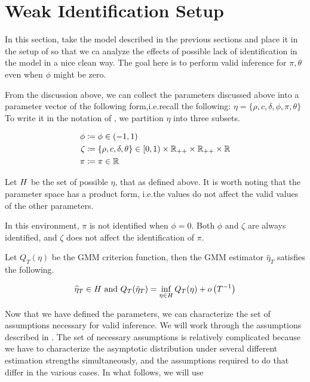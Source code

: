 \documentclass[11pt, letterpaper, twoside, final]{article}
\begin{document}
\section{Weak Identification Setup}

In this section, take the model described in the previous sections and place it in the setup of
\textcite{andrews2014Gmm} so that we ca analyze the effects of possible lack of identification in the model in a
nice clean way.
The goal here is to perform valid inference for $\pi, \theta$ even when $\phi$ might be zero. 


From the discussion above, we can collect the parameters discussed above into a parameter vector of the following
form,i.e.\@ recall the following: $\eta = \lbrace \rho, c, \delta, \phi, \pi, \theta \rbrace$
To write it in the notation of \textcite{andrews2014Gmm}, we partition $\eta$ into three subsets.

\begin{align}
    \phi &\coloneqq \phi  \in (-1, 1) \\ 
    \zeta &\coloneqq \lbrace \rho, c, \delta, \theta \rbrace \in [0,1) \times \mathbb{R}_{++} \times \mathbb{R}_{++} \times
    \mathbb{R}  \\
    \pi &\coloneqq \pi \in \mathbb{R} 
\end{align}

Let $H$ be the set of possible $\eta$, that as defined above.
It is worth noting that the parameter space has a product form, i.e.\@ the values do not affect the valid values
of the other parameters.

In this environment, $\pi$ is not identified when $\phi = 0$.
Both $\phi$ and $\zeta$ are always identified, and $\zeta$ does not affect the identification of $\pi$.

Let $Q_T(\eta)$ be the GMM criterion function, then the GMM estimator $\hat{\eta}_T$ satisfies the following.


\begin{equation}
    \widehat{\eta}_T \in \Eta\ \text{and}\ Q_T(\hat{\eta}_T) = \inf_{\eta \in \Eta} Q_T(\eta) +
    o\left(T^{-1}\right) 
\end{equation}


Now that we have defined the parameters, we can characterize the set of assumptions necessary for valid inference.
We will work through the assumptions described in \textcite{andrews2014Gmm}.
The set of necessary assumptions is relatively complicated because we have to characterize the asymptotic
distribution under several different estimation strengths simultaneously, and the assumptions required to do that
  differ in the various cases. 
In what follows, we will use 
\end{document}
